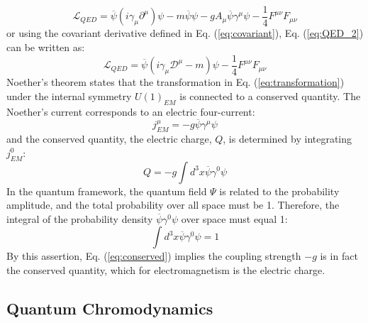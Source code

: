\begin{equation} \label{eq:QED_2}
        \mathscr{L}_{QED} = \overline{\psi} (i\gamma_\mu\partial^\mu)\psi - m\overline{\psi}\psi - g A_\mu \overline{\psi}\gamma^\mu\psi -\frac{1}{4}F^{\mu\nu}F_{\mu\nu}
\end{equation}
or using the covariant derivative defined in Eq. (\ref{eq:covariant}), Eq. (\ref{eq:QED_2}) can be written as:
\begin{equation}
    \mathscr{L}_{QED} = \overline{\psi}(i\gamma_\mu\mathscr{D}^\mu - m)\psi - \frac{1}{4}F^{\mu\nu}F_{\mu\nu}
\end{equation}
Noether's theorem \cite{Noether} states that the transformation in Eq. (\ref{eq:transformation}) under the internal symmetry $U(1)_{EM}$ is connected to a conserved quantity. The Noether's current corresponds to an
electric four-current:
\begin{equation}
    j^{\mu}_{EM} = -g\overline{\psi}\gamma^\mu\psi
\end{equation}
and the conserved quantity, the electric charge, $Q$, is determined by integrating $j^0_{EM}$:
\begin{equation}\label{eq:conserved}
    Q = - g \int d^3x \overline{\psi}\gamma^0\psi
\end{equation}
In the quantum framework, the quantum field $\Psi$ is related to the probability amplitude, and the total probability over all space must be 1. Therefore, the integral of the probability density $\overline{\psi}\gamma^0\psi$ over space must equal 1: 
\begin{equation}
    \int d^3x \overline{\psi}\gamma^0\psi = 1
\end{equation}
By this assertion, Eq. (\ref{eq:conserved}) implies the coupling strength $-g$ is in fact the conserved quantity, which for electromagnetism is the electric charge.

\subsection{\label{intro_QCD}Quantum Chromodynamics}

